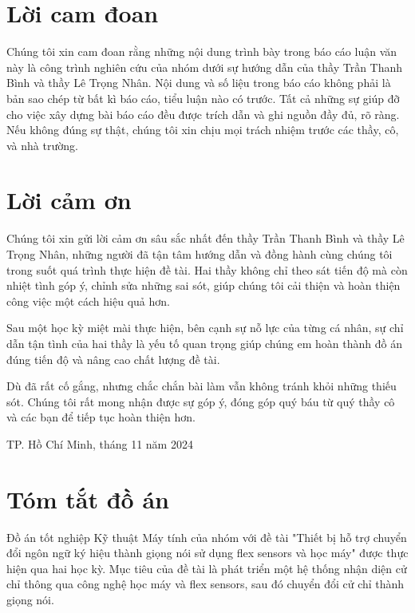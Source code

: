 \documentclass[a4paper]{article}
\begin{document}
\setcounter{page}{1}

\newpage
\section*{Lời cam đoan}

\indent Chúng tôi xin cam đoan rằng những nội dung trình bày trong báo cáo luận văn này là công trình nghiên cứu của nhóm dưới sự hướng dẫn của thầy Trần Thanh Bình và thầy Lê Trọng Nhân. Nội dung và số liệu trong báo cáo không phải là bản sao chép từ bất kì báo cáo, tiểu luận nào có trước. Tất cả những sự giúp đỡ cho việc xây dựng bài báo cáo đều được trích dẫn và ghi nguồn đầy đủ, rõ ràng. Nếu không đúng sự thật, chúng tôi xin chịu mọi trách nhiệm trước các thầy, cô, và nhà trường.

\newpage
\section*{Lời cảm ơn}

\indent Chúng tôi xin gửi lời cảm ơn sâu sắc nhất đến thầy Trần Thanh Bình và thầy Lê Trọng Nhân, những người đã tận tâm hướng dẫn và đồng hành cùng chúng tôi trong suốt quá trình thực hiện đề tài. Hai thầy không chỉ theo sát tiến độ mà còn nhiệt tình góp ý, chỉnh sửa những sai sót, giúp chúng tôi cải thiện và hoàn thiện công việc một cách hiệu quả hơn.

\indent Sau một học kỳ miệt mài thực hiện, bên cạnh sự nỗ lực của từng cá nhân, sự chỉ dẫn tận tình của hai thầy là yếu tố quan trọng giúp chúng em hoàn thành đồ án đúng tiến độ và nâng cao chất lượng đề tài. 

\indent Dù đã rất cố gắng, nhưng chắc chắn bài làm vẫn không tránh khỏi những thiếu sót. Chúng tôi rất mong nhận được sự góp ý, đóng góp quý báu từ quý thầy cô và các bạn để tiếp tục hoàn thiện hơn.

\begin{center}
{\footnotesize TP. Hồ Chí Minh, tháng 11 năm 2024}
\end{center}

\newpage
\section*{Tóm tắt đồ án}

\indent Đồ án tốt nghiệp Kỹ thuật Máy tính của nhóm với đề tài "Thiết bị hỗ trợ chuyển đổi ngôn ngữ ký hiệu thành giọng nói sử dụng flex sensors và học máy" được thực hiện qua hai học kỳ. Mục tiêu của đề tài là phát triển một hệ thống nhận diện cử chỉ thông qua công nghệ học máy và flex sensors, sau đó chuyển đổi cử chỉ thành giọng nói.
\end{document}
